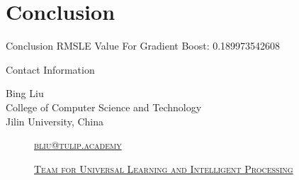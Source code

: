 \documentclass[
 size=14pt,
 paper=smartboard,  %
 mode=present, 		%
 display=slides, 	%
 style=tuliplab,  	%
 pauseslide,
 fleqn,leqno]{powerdot}
\begin{document}
\section{Conclusion}
\begin{slide}[toc=,bm=]{Conclusion}
RMSLE Value For Gradient Boost:  0.189973542608
\end{slide}


\begin{wideslide}[toc=,bm=]{Contact Information}
\centering
{}
\twocolumn[
lcolwidth=0.35\linewidth,
rcolwidth=0.65\linewidth
]
{
}
{
Bing Liu\\
College of Computer Science and Technology\\
Jilin University, China
\begin{description}
 \item[\textcolor{orange}{\faEnvelope}] \href{mailto:bliu@tulip.academy}
 {\textsc{\footnotesize{bliu@tulip.academy}}}

 \item[\textcolor{orange}{\faHome}] \href{http://www.tulip.org.au}
 {\textsc{\footnotesize{Team for Universal Learning and Intelligent Processing}}}
\end{description}
}
\end{wideslide}
\end{document}
